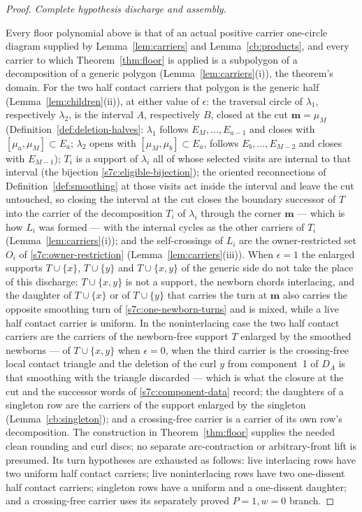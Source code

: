 \begin{proof}
\par\medskip\noindent\emph{Complete hypothesis discharge and assembly.}\par

Every floor polynomial above is that of an actual positive carrier
one-circle diagram supplied by Lemma~\ref{lem:carriers} and
Lemma~\ref{cb:products}, and every carrier to which
Theorem~\ref{thm:floor} is applied is a subpolygon of a decomposition of
a generic polygon (Lemma~\ref{lem:carriers}(i)), the theorem's domain.
For the two half contact carriers that polygon is the generic half
(Lemma~\ref{lem:children}(ii)), at either value of $\epsilon$: the
traversal circle of $\lambda_1$, respectively $\lambda_2$, is the interval
$A$, respectively $B$, closed at the cut $\mathbf m=\mu_M$
(Definition~\ref{def:deletion-halves}: $\lambda_1$ follows
$E_M,\ldots,E_{a-1}$ and closes with $[\mu_a,\mu_M]\subset E_a$;
$\lambda_2$ opens with $[\mu_M,\mu_b]\subset E_a$, follows
$E_b,\ldots,E_{M-2}$ and closes with $E_{M-1}$); $T_i$ is a support of
$\lambda_i$ all of whose selected visits are internal to that interval
(the bijection \eqref{s7c:eligible-bijection}); the oriented
reconnections of Definition~\ref{def:smoothing} at those visits act
inside the interval and leave the cut untouched, so closing the interval
at the cut closes the boundary successor of $T$ into the carrier of the
decomposition $T_i$ of $\lambda_i$ through the corner $\mathbf m$ ---
which is how $L_i$ was formed --- with the internal cycles as the other
carriers of $T_i$ (Lemma~\ref{lem:carriers}(i)); and the self-crossings
of $L_i$ are the owner-restricted set $O_i$ of
\eqref{s7c:owner-restriction} (Lemma~\ref{lem:carriers}(iii)).  When
$\epsilon=1$ the enlarged supports $T\cup\{x\}$, $T\cup\{y\}$ and
$T\cup\{x,y\}$ of the generic side do not take the place of this
discharge: $T\cup\{x,y\}$ is not a support, the newborn chords
interlacing, and the daughter of $T\cup\{x\}$ or of $T\cup\{y\}$ that
carries the turn at $\mathbf m$ also carries the opposite smoothing turn
of \eqref{s7c:one-newborn-turns} and is mixed, while a live half contact
carrier is uniform.  In the noninterlacing case the two half contact
carriers are the carriers of the newborn-free support $T$ enlarged by
the smoothed newborns --- of $T\cup\{x,y\}$ when
$\epsilon=0$, when the third carrier is the crossing-free local contact
triangle and the deletion of the curl $y$ from component~1 of $D_A$ is that
smoothing with the triangle discarded --- which is what the closure at the
cut and the successor words of \eqref{s7c:component-data} record; the
daughters of a singleton row are the carriers of the support enlarged by
the singleton (Lemma~\ref{cb:singleton}); and a crossing-free carrier is a
carrier of its own row's decomposition.  The construction in Theorem~\ref{thm:floor} supplies
the needed clean rounding and curl discs; no separate arc-contraction
or arbitrary-front lift is presumed.  Its turn hypotheses are exhausted
as follows: live interlacing rows have two uniform half contact carriers;
live noninterlacing rows have two one-dissent half contact carriers;
singleton rows have a uniform and a one-dissent daughter; and a
crossing-free carrier uses its separately proved $P=1,w=0$ branch.


\end{proof}
